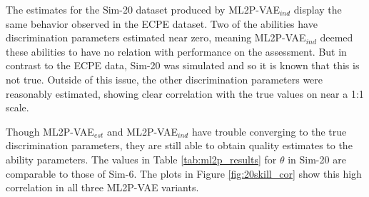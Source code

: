 The estimates for the Sim-20 dataset produced by ML2P-VAE$_{ind}$ display the same behavior observed in the ECPE dataset. Two of the abilities have discrimination parameters estimated near zero, meaning ML2P-VAE$_{ind}$ deemed these abilities to have no relation with performance on the assessment. But in contrast to the ECPE data, Sim-20 was simulated and so it is known that this is not true. Outside of this issue, the other discrimination parameters were reasonably estimated, showing clear correlation with the true values on near a 1:1 scale.

Though ML2P-VAE$_{est}$ and ML2P-VAE$_{ind}$ have trouble converging to the true discrimination parameters, they are still able to obtain quality estimates to the ability parameters. The values in Table \ref{tab:ml2p_results} for $\theta$ in Sim-20 are comparable to those of Sim-6. The plots in Figure \ref{fig:20skill_cor} show this high correlation in all three ML2P-VAE variants.

